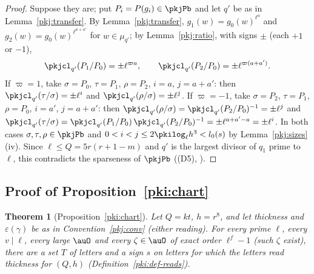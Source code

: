 \documentclass[10pt]{amsart}
\newtheorem{theorem}{Theorem}[section]
\theoremstyle{definition}
\theoremstyle{remark}
\begin{document}
\begin{proof}
Suppose they are; put $P_i=P(g_i)\in\pkjPb$ and let $q'$ be as in Lemma~\ref{pkj:transfer}. By
Lemma~\ref{pkj:transfer}, $g_1(w)=g_0(w)^{\ell^a}$ and $g_2(w)=g_0(w)^{\ell^{a+a'}}$ for $w\in\mu_{q'}$;
by Lemma~\ref{pkj:ratio}, with signs $\pm$ (each $+1$ or $-1$),
\[
\pkjcl_{q'}(P_1/P_0)=\pm\ell^{\varpi a},\qquad \pkjcl_{q'}(P_2/P_0)=\pm\ell^{\varpi(a+a')} .
\]
If $\varpi=1$, take $\sigma=P_0$, $\tau=P_1$, $\rho=P_2$, $i=a$, $j=a+a'$: then $\pkjcl_{q'}(\tau/\sigma)=
\pm\ell^i$ and $\pkjcl_{q'}(\rho/\sigma)=\pm\ell^j$. If $\varpi=-1$, take $\sigma=P_2$, $\tau=P_1$,
$\rho=P_0$, $i=a'$, $j=a+a'$: then $\pkjcl_{q'}(\rho/\sigma)=\pkjcl_{q'}(P_2/P_0)^{-1}=\pm\ell^{j}$ and
$\pkjcl_{q'}(\tau/\sigma)=\pkjcl_{q'}(P_1/P_0)\,\pkjcl_{q'}(P_2/P_0)^{-1}=\pm\ell^{a+a'-a}=\pm\ell^{i}$.
In both cases $\sigma,\tau,\rho\in\pkjPb$ and $0<i<j\le2\pkilog_\ell h^3<l_0(s)$ by
Lemma~\ref{pkj:sizes}(iv). Since $\ell\le Q=5r(r+1-m)$ and $q'$ is the largest divisor of $q_1$
prime to $\ell$, this contradicts the sparseness of $\pkjPb$ ((D5), {\cite[Definition~13.2]{P46}}).
\end{proof}

\subsection{Proof of Proposition~\ref{pki:chart}}\label{pkj:ss-proof}

\begin{theorem}[Proposition~\ref{pki:chart}]\label{pkj:chart}
Let $Q=kt$, $h=r^8$, and let thickness and $\varepsilon(\gamma)$ be as in Convention~\ref{pkj:conv}
(either reading). For every prime $\ell$, every $v\mid\ell$, every large $\auO$ and every
$\zeta\in\auO$ of exact order $\ell^f-1$ (such $\zeta$ exist), there are a set $T$ of letters and a sign
$s$ on letters for which the letters read thickness for $(Q,h)$ (Definition~\ref{pki:def-reads}).
\end{theorem}
\end{document}
